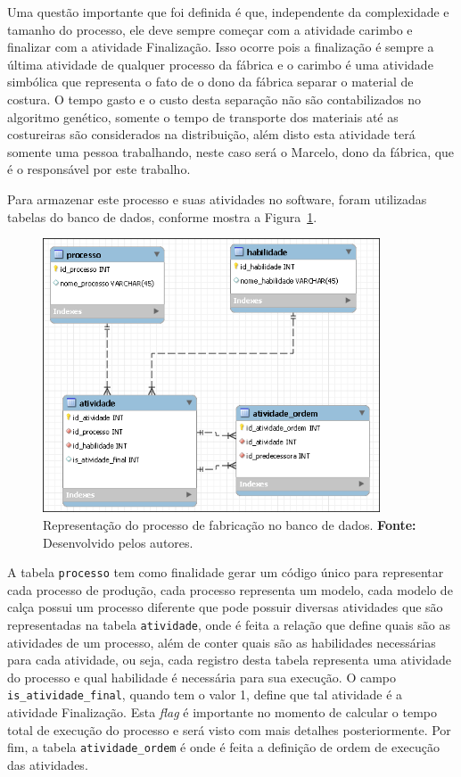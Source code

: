 \par  Uma questão importante que foi definida é que, independente da complexidade e tamanho do processo, ele deve sempre começar 
com a atividade carimbo e finalizar com a atividade Finalização. Isso ocorre pois a finalização é sempre a última atividade 
de qualquer processo da fábrica e o carimbo é uma atividade simbólica que representa o fato de o dono da fábrica separar o 
material de costura. O tempo gasto e o custo desta separação não são contabilizados no algoritmo genético, somente o tempo de 
transporte dos materiais até as costureiras são considerados na distribuição, além disto esta atividade terá somente uma pessoa
trabalhando, neste caso será o Marcelo, dono da fábrica, que é o responsável por este trabalho.

\par Para armazenar este processo e suas atividades no software, foram utilizadas tabelas do banco de dados, conforme mostra 
a Figura~\ref{fig:proc_fabri_db}.


\begin{figure}[h!]
	\centerline{\includegraphics[width=10cm]{./imagens/representacao_processo.png}}
	\caption[Modelo do processo de fabricação no banco de dados.]
	{Representação do processo de fabricação no banco de dados. \textbf{Fonte:}
	Desenvolvido pelos autores.}
	\label{fig:proc_fabri_db}
\end{figure}

\par A tabela \texttt{processo} tem como finalidade gerar um código único para representar 
cada processo de produção, cada processo representa um modelo, cada modelo
de calça possui um processo diferente que pode possuir diversas atividades que
são representadas na tabela \texttt{atividade}, onde é feita a relação que define quais são as atividades de 
um processo,  além de conter quais são as habilidades necessárias para cada atividade, ou seja, cada registro desta 
tabela representa uma atividade do processo e qual habilidade é necessária para sua execução. O campo 
\texttt{is\_atividade\_final}, quando tem o valor 1, define que tal atividade
é a atividade Finalização. Esta \textit{flag} é importante no momento de calcular o tempo total de execução do
processo e será visto com mais detalhes posteriormente. Por fim, a tabela
\texttt{atividade\_ordem} é onde é feita a definição de ordem de execução das
atividades.

